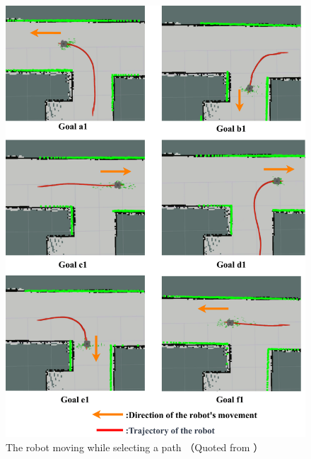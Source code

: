 \begin{figure}[htbp]
    \centering
     \includegraphics[width=130mm]{images/pdf/zyuziroute-select_a.pdf}
     \caption{The robot moving while selecting a path （Quoted from \cite{haruyama2022}）}
     \label{fig:haru_mech_a_select}
\end{figure}
